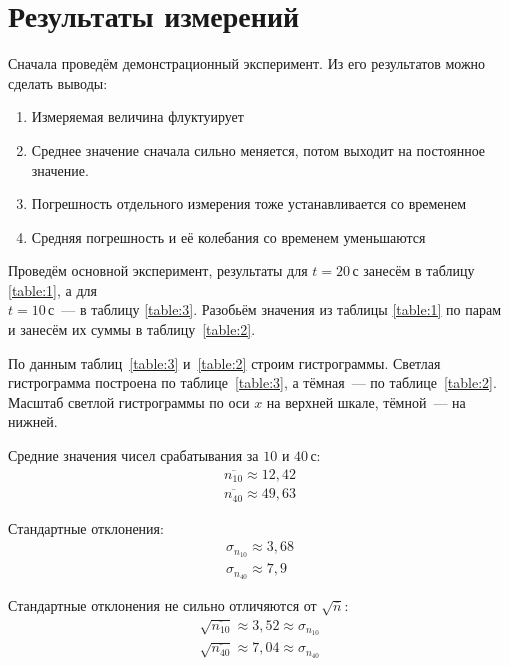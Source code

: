 \section{Результаты измерений}
Сначала проведём демонстрационный эксперимент.
Из его результатов можно сделать выводы:
\begin{enumerate}
    \item Измеряемая величина флуктуирует
    \item Среднее значение сначала сильно меняется,
    потом выходит на постоянное значение.
    \item Погрешность отдельного измерения тоже
    устанавливается со временем
    \item Средняя погрешность и её колебания со временем уменьшаются
\end{enumerate}

Проведём основной эксперимент, результаты для $t=20\,\text{с}$ занесём
в таблицу \ref{table:1}, а для\\ $t=10\,\text{с}$~--- в таблицу \ref{table:3}.
Разобьём значения из таблицы \ref{table:1} по парам и занесём их суммы в
таблицу~\ref{table:2}.

По данным таблиц~\ref{table:3} и~\ref{table:2} строим гистрограммы.
Светлая гистрограмма построена по таблице~\ref{table:3}, а тёмная~---
по таблице~\ref{table:2}. Масштаб светлой гистрограммы по оси $x$ 
на верхней шкале, тёмной~--- на нижней.

Средние значения чисел срабатывания за $10$ и $40\,\text{с}$:
\begin{displaymath}
\begin{split}
    \overline{n_{10}}\approx 12{,}42 \\
    \overline{n_{40}}\approx 49{,}63
\end{split}
\end{displaymath}

Стандартные отклонения:
\begin{displaymath}
\begin{split}
    \sigma_{n_{10}}\approx 3{,}68 \\
    \sigma_{n_{40}}\approx 7{,}9
\end{split}
\end{displaymath}

Стандартные отклонения не сильно отличяются от $\sqrt{\overline{n}}$:
\begin{displaymath}
\begin{split}
    \sqrt{\overline{n_{10}}}\approx 3{,}52\approx \sigma_{n_{10}} \\
    \sqrt{\overline{n_{40}}}\approx 7{,}04\approx \sigma_{n_{40}}
\end{split}
\end{displaymath}

